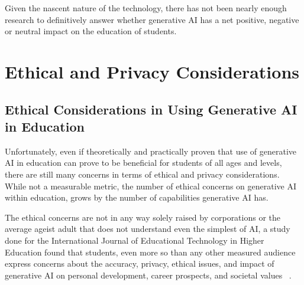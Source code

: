 \documentclass[a4paper,12pt]{report}
\begin{document}
Given the nascent nature of the technology, there has not been nearly enough research to definitively answer whether generative AI has a net positive, negative or neutral impact on the education of students. 

\newpage
\chapter{Ethical and Privacy Considerations} \label{chap:ethical-privacy}
\newpage
\section{Ethical Considerations in Using Generative AI in Education} \label{sect:ethical-considerations}
\hspace{10mm} Unfortunately, even if theoretically and practically proven that use of generative AI in education can prove to be beneficial for students of all ages and levels, there are still many concerns in terms of ethical and privacy considerations. While not a measurable metric, the number of ethical concerns on generative AI within education, grows by the number of capabilities generative AI has.

The ethical concerns are not in any way solely raised by corporations or the average ageist adult that does not understand even the simplest of AI, a study done for the International Journal of Educational Technology in Higher Education found that students, even more so than any other measured audience express concerns about the accuracy, privacy, ethical issues, and impact of generative AI on personal development, career prospects, and societal values ~\cite{chan2023students}.
\end{document}
